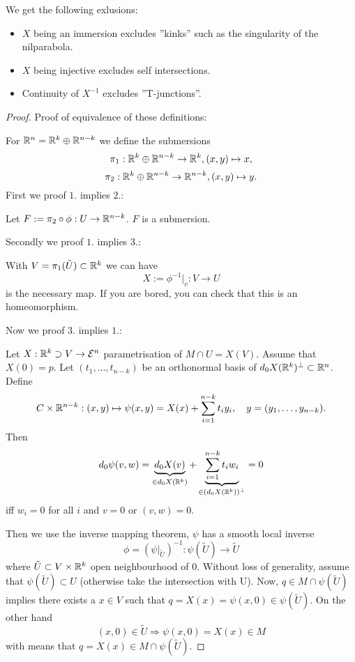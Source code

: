 \begin{remark} We get the following exlusions:	
	\begin{itemize}
		\item $X$ being an immersion excludes ''kinks'' such as the singularity of the nilparabola.
		\item $X$ being injective excludes self intersections.
		\item Continuity of $X^{-1}$ excludes ''T-junctions''.
	\end{itemize}
\end{remark}

\begin{proof}
	Proof of equivalence of these definitions:
	
	For $\mathbb R^n = \mathbb R^k \oplus \mathbb R^{n-k}$ we define the submersions
		\[ \pi_1: \mathbb R^k \oplus \mathbb R^{n-k} \to \mathbb R^k, (x,y) \mapsto x, \]
		\[ \pi_2: \mathbb R^k \oplus \mathbb R^{n-k} \to \mathbb R^{n-k}, (x,y) \mapsto y. \]
	First we proof $1.$ implies $2.$:
	
	Let $F:= \pi_2 \circ \phi: U \to \mathbb R^{n-k}$. $F$ is a submersion.
	
	Secondly we proof $1.$ implies $3.$:
	
	With $V= \pi_1(\tilde U) \subset \mathbb R^k$ we can have
		\[ X:= \phi^{-1}\big|_v: V \to U \]
	is the necessary map.
	If you are bored, you can check that this is an homeomorphism.
	
	Now we proof $3.$ implies $1.$:
	
	Let $X: \mathbb R^k \supset V \to \mathcal E^n$ parametrisation of $M \cap U = X(V)$. Assume that $X(0)= p$. Let $(t_1, \ldots,t_{n-k})$ be an orthonormal basis of $d_0X(\mathbb R^k)^\perp \subset \mathbb R^n$. Define
		\[ C \times \mathbb R^{n-k}: (x,y) \mapsto \psi(x,y)= X(x)+ \sum_{i=1}^{n-k} t_iy_i, \quad y=(y_1,\ldots,y_{n-k}). \]
	Then 
		\[ d_0\psi(v,w) = \underbrace{d_0X(v)}_{\in d_0X(\mathbb R^k)} + \underbrace{\sum_{i=1}^{n-k} t_i w_i}_{\in (d_0X(\mathbb R^k))^\perp} = 0 \]
	iff $w_i=0$ for all $i$ and $v=0$ or $(v,w)=0$. 
	
	Then we use the inverse mapping theorem, $\psi$ has a smooth local inverse
		\[ \phi=(\psi\big|_{\tilde U})^{-1}: \psi(\tilde U) \to \tilde U \]
	where $\tilde U \subset V \times \mathbb R^k$ open neighbourhood of $0$. Without loss of generality, assume that $\psi(\tilde U) \subset U$ (otherwise take the intersection with U).
	Now, $q \in M \cap \psi(\tilde U)$ implies there exists a $x \in V$ such that $q= X(x)= \psi(x,0) \in \psi(\tilde U)$. On the other hand 
		\[ (x,0) \in \tilde U \Rightarrow \psi(x,0) = X(x) \in M \]
	with means that $q=X(x) \in M \cap \psi(\tilde U)$.
	

\end{proof}

